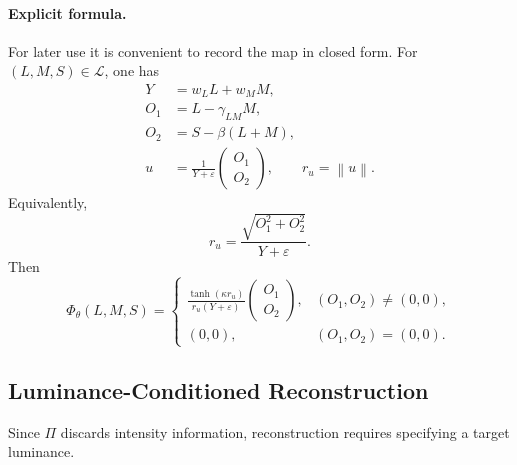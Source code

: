 \documentclass[11pt]{article}
\theoremstyle{plain}
\theoremstyle{definition}
\theoremstyle{remark}
\newcommand{\norm}[1]{\left\lVert #1 \right\rVert}
\begin{document}
\paragraph{Explicit formula.} For later use it is convenient to record the map in closed form. For $(L, M, S) \in \mathcal{L}$, one has
\begin{align*}
Y &= w_L L + w_M M, \\
O_1 &= L - \gamma_{LM} M, \\
O_2 &= S - \beta(L + M), \\
u &= \frac{1}{Y + \varepsilon}\begin{pmatrix} O_1 \\ O_2 \end{pmatrix},
\qquad
r_u = \norm{u}.
\end{align*}
Equivalently,
\[
 r_u = \frac{\sqrt{O_1^2 + O_2^2}}{Y + \varepsilon}.
\]
Then
\begin{equation}
\boxed{
\Phi_\theta(L, M, S) = \begin{cases}
\displaystyle \frac{\tanh(\kappa r_u)}{r_u(Y + \varepsilon)} \begin{pmatrix} O_1 \\ O_2 \end{pmatrix}, & (O_1, O_2) \neq (0,0), \\[1em]
(0,0), & (O_1, O_2) = (0,0).
\end{cases}
}
\end{equation}

\subsection{Luminance-Conditioned Reconstruction}
\label{sec:inverse}

Since $\Pi$ discards intensity information, reconstruction requires specifying a target luminance.
\end{document}
